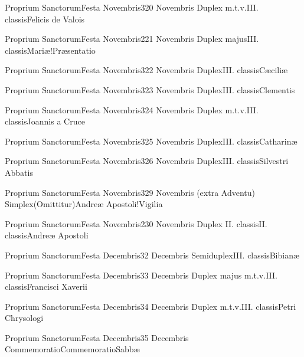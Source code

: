 \documentclass[psalterium-feriale.tex]{subfiles}
\begin{document}
	{Proprium Sanctorum}{Festa Novembris}{3}{20 Novembris}
	{Duplex m.t.v.}{III. classis}{Felicis de Valois}
	{}
	{}
\COPObRubric

	{Proprium Sanctorum}{Festa Novembris}{2}{21 Novembris}
	{Duplex majus}{III. classis}{Mariæ!Præsentatio}
	{\psalmodiapropria}
	{\CBMVRubric}

	{Proprium Sanctorum}{Festa Novembris}{3}{22 Novembris}
	{Duplex}{III. classis}{Cæciliæ}
	{}
	{}
\psalmodiapropria

	{Proprium Sanctorum}{Festa Novembris}{3}{23 Novembris}
	{Duplex}{III. classis}{Clementis}
	{}
	{}
\UMEXcRubric

	{Proprium Sanctorum}{Festa Novembris}{3}{24 Novembris}
	{Duplex m.t.v.}{III. classis}{Joannis a Cruce}
	{}
	{}
\COPObRubric

	{Proprium Sanctorum}{Festa Novembris}{3}{25 Novembris}
	{Duplex}{III. classis}{Catharinæ}
	{}
	{}
\MUVMbRubric

	{Proprium Sanctorum}{Festa Novembris}{3}{26 Novembris}
	{Duplex}{III. classis}{Silvestri Abbatis}
	{}
	{}
\COPObRubric

	{Proprium Sanctorum}{Festa Novembris}{3}{29 Novembris (extra Adventu)}
	{Simplex}{(Omittitur)}{Andreæ Apostoli!Vigilia}
	{}
	{}
\feriaRubric

	{Proprium Sanctorum}{Festa Novembris}{2}{30 Novembris}
	{Duplex II. classis}{II. classis}{Andreæ Apostoli}
	{}
	{}
\psalmodiapropria

	{Proprium Sanctorum}{Festa Decembris}{3}{2 Decembris}
	{Semiduplex}{III. classis}{Bibianæ}
	{}
	{}
\MUVMaRubric

	{Proprium Sanctorum}{Festa Decembris}{3}{3 Decembris}
	{Duplex majus m.t.v.}{III. classis}{Francisci Xaverii}
	{}
	{}
\COPOcRubric

	{Proprium Sanctorum}{Festa Decembris}{3}{4 Decembris}
	{Duplex m.t.v.}{III. classis}{Petri Chrysologi}
	{}
	{}
\COPOcRubric

	{Proprium Sanctorum}{Festa Decembris}{3}{5 Decembris}
	{Commemoratio}{Commemoratio}{Sabbæ}
	{}
	{}
\feriaRubric
\end{document}
